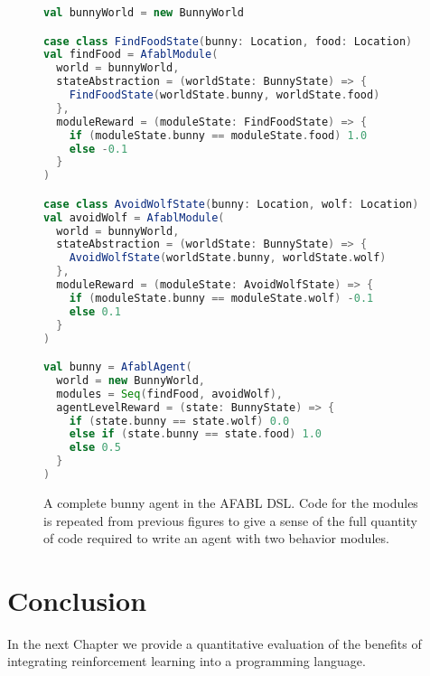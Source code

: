 \begin{figure}[!h]
\begin{center}

\begin{lstlisting}[language=Scala]
val bunnyWorld = new BunnyWorld

case class FindFoodState(bunny: Location, food: Location)
val findFood = AfablModule(
  world = bunnyWorld,
  stateAbstraction = (worldState: BunnyState) => {
    FindFoodState(worldState.bunny, worldState.food)
  },
  moduleReward = (moduleState: FindFoodState) => {
    if (moduleState.bunny == moduleState.food) 1.0
    else -0.1
  }
)

case class AvoidWolfState(bunny: Location, wolf: Location)
val avoidWolf = AfablModule(
  world = bunnyWorld,
  stateAbstraction = (worldState: BunnyState) => {
    AvoidWolfState(worldState.bunny, worldState.wolf)
  },
  moduleReward = (moduleState: AvoidWolfState) => {
    if (moduleState.bunny == moduleState.wolf) -0.1
    else 0.1
  }
)

val bunny = AfablAgent(
  world = new BunnyWorld,
  modules = Seq(findFood, avoidWolf),
  agentLevelReward = (state: BunnyState) => {
    if (state.bunny == state.wolf) 0.0
    else if (state.bunny == state.food) 1.0
    else 0.5
  }
)
\end{lstlisting}

\caption{A complete bunny agent in the AFABL DSL. Code for the modules is repeated from previous figures to give a sense of the full quantity of code required to write an agent with two behavior modules.}
\end{center}
\label{fig:afabl-bunny-code}
\end{figure}

\section{Conclusion}

In the next Chapter we provide a quantitative evaluation of the benefits of integrating reinforcement learning into a programming language.
